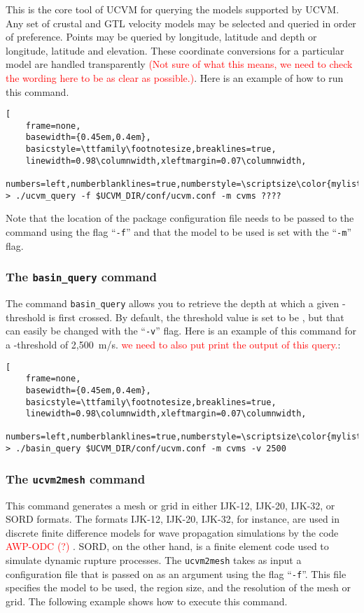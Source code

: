 This is the core tool of UCVM for querying the models supported by UCVM. Any set of crustal and GTL velocity models may be selected and queried in order of preference. Points may be queried by longitude, latitude and depth or longitude, latitude and elevation. These coordinate conversions for a particular model are handled transparently \textcolor{red}{(Not sure of what this means, we need to check the wording here to be as clear as possible.)}. Here is an example of how to run this command.

\begin{lstlisting}[
	frame=none,
	basewidth={0.45em,0.4em},
	basicstyle=\ttfamily\footnotesize,breaklines=true,
	linewidth=0.98\columnwidth,xleftmargin=0.07\columnwidth,
	numbers=left,numberblanklines=true,numberstyle=\scriptsize\color{mylistingnclr}]
> ./ucvm_query -f $UCVM_DIR/conf/ucvm.conf -m cvms ????
\end{lstlisting}

Note that the location of the package configuration file needs to be passed to the command using the flag ``\texttt{-f}'' and that the model to be used is set with the ``\texttt{-m}'' flag. 

\subsubsection{The \textup{\texttt{basin\_query}} command}

The command \texttt{basin\_query} allows you to retrieve the depth at which a given \vs{}-threshold is first crossed. By default, the threshold value is set to be , but that can easily be changed with the ``\texttt{-v}'' flag. Here is an example of this command for a \vs-threshold of 2,500~m/s. \textcolor{red}{we need to also put print the output of this query.}:

\begin{lstlisting}[
	frame=none,
	basewidth={0.45em,0.4em},
	basicstyle=\ttfamily\footnotesize,breaklines=true,
	linewidth=0.98\columnwidth,xleftmargin=0.07\columnwidth,
	numbers=left,numberblanklines=true,numberstyle=\scriptsize\color{mylistingnclr}]
> ./basin_query $UCVM_DIR/conf/ucvm.conf -m cvms -v 2500
\end{lstlisting}

\subsubsection{The \textup{\texttt{ucvm2mesh}} command}

This command generates a mesh or grid in either IJK-12, IJK-20, IJK-32, or SORD formats. The formats IJK-12, IJK-20, IJK-32, for instance, are used in discrete finite difference models for wave propagation simulations by the code \textcolor{red}{AWP-ODC (?) \citep{Cui_2010_Proc}}. SORD, on the other hand, is a finite element code used to simulate dynamic rupture processes. The \texttt{ucvm2mesh} takes as input a configuration file that is passed on as an argument using the flag ``\texttt{-f}''. This file specifies the model to be used, the region size, and the resolution of the mesh or grid. The following example shows how to execute this command.

